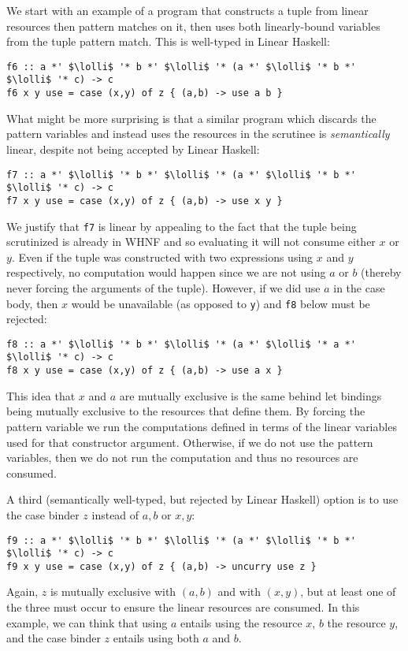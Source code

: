 \documentclass[acmsmall,review,screen]{acmart}
\newcommand{\incode}[1]{\lstinline{#1}}
\newcommand{\lolli}{\multimap}
\begin{document}
We start with an
example of a program that constructs a tuple from linear resources then pattern
matches on it, then uses both linearly-bound variables from the tuple pattern
match. This is well-typed in Linear Haskell:
\begin{working}
\begin{lstlisting}
f6 :: a *' $\lolli$ '* b *' $\lolli$ '* (a *' $\lolli$ '* b *' $\lolli$ '* c) -> c
f6 x y use = case (x,y) of z { (a,b) -> use a b }
\end{lstlisting}
\end{working}
What might be more surprising is that a similar program which discards the
pattern variables and instead uses the resources in the scrutinee is 
\emph{semantically} linear, despite not being accepted by Linear Haskell:
\begin{notyet}
\begin{lstlisting}
f7 :: a *' $\lolli$ '* b *' $\lolli$ '* (a *' $\lolli$ '* b *' $\lolli$ '* c) -> c
f7 x y use = case (x,y) of z { (a,b) -> use x y }
\end{lstlisting}
\end{notyet}
We justify that \incode{f7} is linear by appealing to the fact that 
the tuple being scrutinized is already in WHNF and so evaluating it will
not consume either $x$ or $y$. Even if the tuple was constructed with
two expressions using $x$ and $y$ respectively, no computation would happen
since we are not using $a$ or $b$ (thereby never forcing the arguments
of the tuple). However, if we did use $a$ in the case body, then $x$
would be unavailable (as opposed to \incode{y}) and \incode{f8} below must be rejected:
\begin{noway}
\begin{lstlisting}
f8 :: a *' $\lolli$ '* b *' $\lolli$ '* (a *' $\lolli$ '* a *' $\lolli$ '* c) -> c
f8 x y use = case (x,y) of z { (a,b) -> use a x }
\end{lstlisting}
\end{noway}
This idea that $x$ and $a$ are mutually exclusive is the same behind let
bindings being mutually exclusive to the resources that define them.
By forcing the pattern variable we run the computations
defined in terms of the linear variables used for that constructor
argument. Otherwise, if we do not use the pattern variables, then we
do not run the computation and thus no resources are consumed.

A third (semantically well-typed, but rejected by Linear Haskell) option is to use the case binder $z$ instead of $a,b$ or $x,y$:
\begin{notyet}
\begin{lstlisting}
f9 :: a *' $\lolli$ '* b *' $\lolli$ '* (a *' $\lolli$ '* b *' $\lolli$ '* c) -> c
f9 x y use = case (x,y) of z { (a,b) -> uncurry use z }
\end{lstlisting}
\end{notyet}
Again, $z$ is mutually exclusive with $(a,b)$ and with $(x,y)$, but at least one of
the three must occur to ensure the linear resources are consumed. In this
example, we can think that using $a$ entails using the resource $x$, $b$ the
resource $y$, and the case binder $z$ entails using both $a$ and $b$.
\end{document}
